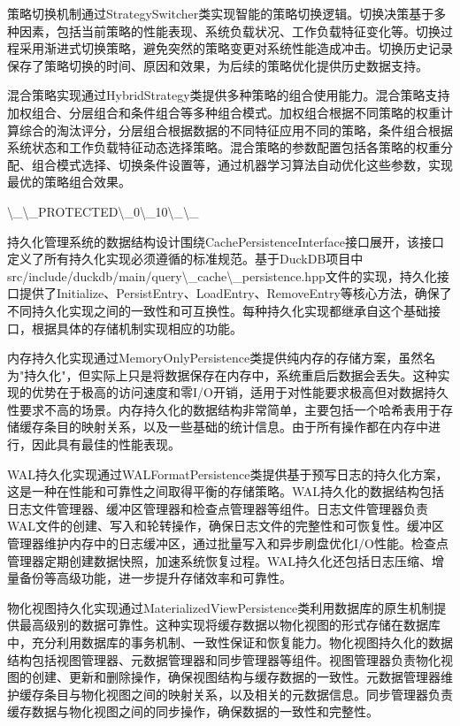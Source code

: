策略切换机制通过StrategySwitcher类实现智能的策略切换逻辑。切换决策基于多种因素，包括当前策略的性能表现、系统负载状况、工作负载特征变化等。切换过程采用渐进式切换策略，避免突然的策略变更对系统性能造成冲击。切换历史记录保存了策略切换的时间、原因和效果，为后续的策略优化提供历史数据支持。

混合策略实现通过HybridStrategy类提供多种策略的组合使用能力。混合策略支持加权组合、分层组合和条件组合等多种组合模式。加权组合根据不同策略的权重计算综合的淘汰评分，分层组合根据数据的不同特征应用不同的策略，条件组合根据系统状态和工作负载特征动态选择策略。混合策略的参数配置包括各策略的权重分配、组合模式选择、切换条件设置等，通过机器学习算法自动优化这些参数，实现最优的策略组合效果。

\textbackslash{}_\textbackslash{}_PROTECTED\textbackslash{}_0\textbackslash{}_10\textbackslash{}_\textbackslash{}_

持久化管理系统的数据结构设计围绕CachePersistenceInterface接口展开，该接口定义了所有持久化实现必须遵循的标准规范。基于DuckDB项目中src/include/duckdb/main/query\textbackslash{}_cache\textbackslash{}_persistence.hpp文件的实现，持久化接口提供了Initialize、PersistEntry、LoadEntry、RemoveEntry等核心方法，确保了不同持久化实现之间的一致性和可互换性。每种持久化实现都继承自这个基础接口，根据具体的存储机制实现相应的功能。

内存持久化实现通过MemoryOnlyPersistence类提供纯内存的存储方案，虽然名为"持久化"，但实际上只是将数据保存在内存中，系统重启后数据会丢失。这种实现的优势在于极高的访问速度和零I/O开销，适用于对性能要求极高但对数据持久性要求不高的场景。内存持久化的数据结构非常简单，主要包括一个哈希表用于存储缓存条目的映射关系，以及一些基础的统计信息。由于所有操作都在内存中进行，因此具有最佳的性能表现。

WAL持久化实现通过WALFormatPersistence类提供基于预写日志的持久化方案，这是一种在性能和可靠性之间取得平衡的存储策略。WAL持久化的数据结构包括日志文件管理器、缓冲区管理器和检查点管理器等组件。日志文件管理器负责WAL文件的创建、写入和轮转操作，确保日志文件的完整性和可恢复性。缓冲区管理器维护内存中的日志缓冲区，通过批量写入和异步刷盘优化I/O性能。检查点管理器定期创建数据快照，加速系统恢复过程。WAL持久化还包括日志压缩、增量备份等高级功能，进一步提升存储效率和可靠性。

物化视图持久化实现通过MaterializedViewPersistence类利用数据库的原生机制提供最高级别的数据可靠性。这种实现将缓存数据以物化视图的形式存储在数据库中，充分利用数据库的事务机制、一致性保证和恢复能力。物化视图持久化的数据结构包括视图管理器、元数据管理器和同步管理器等组件。视图管理器负责物化视图的创建、更新和删除操作，确保视图结构与缓存数据的一致性。元数据管理器维护缓存条目与物化视图之间的映射关系，以及相关的元数据信息。同步管理器负责缓存数据与物化视图之间的同步操作，确保数据的一致性和完整性。

